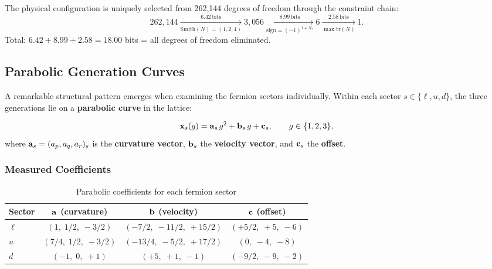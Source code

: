 The physical configuration is uniquely selected from 262,144 degrees of freedom through the constraint chain:
\begin{equation}
262{,}144 \xrightarrow[\mathrm{Smith}(N)=(1,2,4)]{6.42\,\mathrm{bits}} 3{,}056 \xrightarrow[\mathrm{sign}=(-1)^{1+N_c}]{8.99\,\mathrm{bits}} 6 \xrightarrow[\max\mathrm{tr}(N)]{2.58\,\mathrm{bits}} 1.
\end{equation}
Total: $6.42 + 8.99 + 2.58 = 18.00$ bits = all degrees of freedom eliminated.

\subsection{Parabolic Generation Curves}\label{sec:parabolic_curves}

A remarkable structural pattern emerges when examining the fermion sectors individually. Within each sector $s \in \{\ell, u, d\}$, the three generations lie on a \textbf{parabolic curve} in the lattice:

\begin{equation}
\mathbf{x}_s(g) = \mathbf{a}_s \, g^2 + \mathbf{b}_s \, g + \mathbf{c}_s, \qquad g \in \{1, 2, 3\},
\end{equation}
where $\mathbf{a}_s = (a_p, a_q, a_r)_s$ is the \textbf{curvature vector}, $\mathbf{b}_s$ the \textbf{velocity vector}, and $\mathbf{c}_s$ the \textbf{offset}.

\subsubsection{Measured Coefficients}

\begin{table}[h]
\centering
\caption{Parabolic coefficients for each fermion sector}
\label{tab:parabolic_coeffs}
\begin{tabular}{lccc}
\hline\hline
Sector & $\mathbf{a}$ (curvature) & $\mathbf{b}$ (velocity) & $\mathbf{c}$ (offset) \\
\hline
$\ell$ & $(1,\; 1/2,\; -3/2)$ & $(-7/2,\; -11/2,\; +15/2)$ & $(+5/2,\; +5,\; -6)$ \\
$u$ & $(7/4,\; 1/2,\; -3/2)$ & $(-13/4,\; -5/2,\; +17/2)$ & $(0,\; -4,\; -8)$ \\
$d$ & $(-1,\; 0,\; +1)$ & $(+5,\; +1,\; -1)$ & $(-9/2,\; -9,\; -2)$ \\
\hline\hline
\end{tabular}
\end{table}

